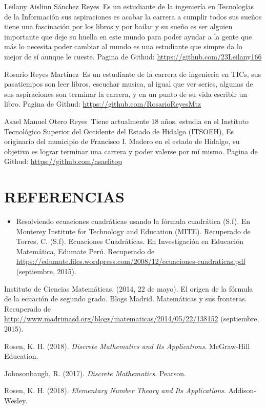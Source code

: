 \documentclass{IEEEcsmag}
\begin{document}
\begin{IEEEbiography}{Leilany Aislinn Sánchez Reyes}{\,} Es un estudiante de la ingeniería en Tecnologías de la Información  sus aspiraciones es acabar la carrera a cumplir todos sus sueños tiene una fascinación por los libros y  por bailar y su sueño es ser alguien importante que deje su huella en este mundo para poder ayudar a la gente que más lo necesita poder cambiar al mundo es una estudiante que simpre da lo mejor de sí aunque le cueste.
Pagina de Githud: \url{https://github.com/23Leilany166}
\end{IEEEbiography}

\begin{IEEEbiography}{Rosario Reyes Martinez}{\,} Es un estudiante de la carrera de ingenieria en TICs, sus pasatiempos son leer libros, escuchar musica, al igual que ver series, algunas de sus aspiraciones son terminar la carrera, y en un punto de su vida escribir un libro. 
Pagina de Githud: \url{https://github.com/RosarioReyesMtz}
\end{IEEEbiography}

\begin{IEEEbiography}{Asael Manuel Otero Reyes}{\,} Tiene actualmente 18 años, estudia en el Instituto Tecnológico Superior del Occidente del Estado de Hidalgo (ITSOEH), Es originario del municipio de Francisco I. Madero en el estado de Hidalgo, su objetivo es lograr terminar una carrera y poder valerse por mí mismo.
Pagina de Githud: \url{https://github.com/asaelitop}
\end{IEEEbiography}

\section{REFERENCIAS}

\begin{itemize}
    \item Resolviendo ecuaciones cuadráticas usando la fórmula cuadrática (S.f). En Monterey Institute for Technology and Education (MITE). Recuperado de Torres, C. (S.f). Ecuaciones Cuadráticas. En Investigación en Educación Matemática, Edumate Perú. Recuperado de \url{https://edumate.files.wordpress.com/2008/12/ecuaciones-cuadraticas.pdf} (septiembre, 2015).
\end{itemize}

\begin{thebibliography}{99}
Instituto de Ciencias Matemáticas. (2014, 22 de mayo). El origen de la fórmula de la ecuación de segundo grado. Blogs Madrid. Matemáticas y sus fronteras. Recuperado de \url{http://www.madrimasd.org/blogs/matematicas/2014/05/22/138152} (septiembre, 2015).

Rosen, K. H. (2018). \textit{Discrete Mathematics and Its Applications}. McGraw-Hill Education.

Johnsonbaugh, R. (2017). \textit{Discrete Mathematics}. Pearson.

Rosen, K. H. (2018). \textit{Elementary Number Theory and Its Applications}. Addison-Wesley.
\end{thebibliography}
\end{document}
